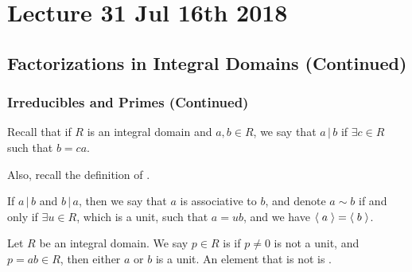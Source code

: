 \chapter{Lecture 31 Jul 16th 2018}%
\label{chp:lecture_31_jul_16th_2018}

\section{Factorizations in Integral Domains (Continued)}%
\label{sec:factorizations_in_integral_domains_continued}

\subsection{Irreducibles and Primes (Continued)}%
\label{sub:irreducibles_and_primes_continued}

\begin{note}
  Recall that if $R$ is an integral domain and $a, b \in R$, we say that $a \, | \, b$ if $\exists c \in R$ such that $b = ca$.
\end{note}

Also, recall the definition of .

\begin{defnnonum}[Associativity]
  If $a \, | \, b$ and $b \, | \, a$, then we say that $a$ is associative to $b$, and denote $a \sim b$ if and only if $\exists u \in R$, which is a unit, such that $a = ub$, and we have $\langle \; a \; \rangle = \langle \; b \; \rangle$.
\end{defnnonum}

\begin{defn}[Irreducible]
\label{defn:irreducible}
  Let $R$ be an integral domain. We say $p \in R$ is  if $p \neq 0$ is not a unit, and $p = ab \in R$, then either $a$ or $b$ is a unit. An element that is not  is .
\end{defn}

